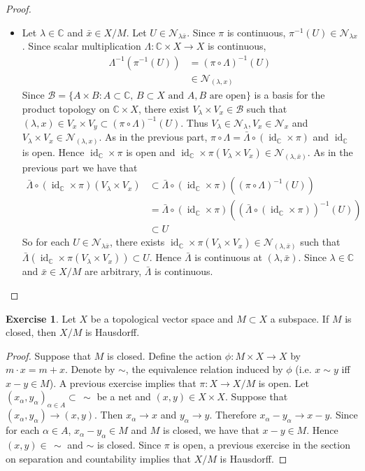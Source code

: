 \documentclass[12pt]{amsart}
\theoremstyle{definition}
\newtheorem{ex}[definition]{Exercise}
\newcommand{\al}{\alpha}
\newcommand{\lam}{\lambda}
\newcommand{\Lam}{\Lambda}
\newcommand{\C}{\mathbb{C}}
\newcommand{\MB}{\mathcal{B}}
\newcommand{\MN}{\mathcal{N}}
\DeclareMathOperator{\id}{id}
\begin{document}
\begin{proof}
\begin{itemize}
			\item Let $\lam \in \C$ and $\bar{x} \in X / M$. Let $U \in \MN_{\lam \bar{x}}$. Since $\pi$ is continuous, $\pi^{-1}(U) \in \MN_{\lam x}$. Since scalar multiplication $\Lam: \C \times X  \rightarrow X$ is continuous, 
			\begin{align*}
				\Lam^{-1}(\pi^{-1}(U)) 
				& = (\pi \circ \Lam)^{-1}( U) \\
				& \in \MN_{(\lam, x)}
			\end{align*} 
			Since $\MB = \{A \times B: \text{$A \subset \C$, $B \subset X$ and $A,B$ are open}\}$ is a basis for the product topology on $\C \times X$, there exist $V_{\lam} \times V_x \in \MB$ such that $(\lam,x) \in V_x \times V_y \subset  (\pi \circ \Lam)^{-1}(U)$. Thus $V_{\lam} \in \MN_{\lam}, V_x \in \MN_x$ and $V_{\lam} \times V_x \in \MN_{(\lam, x)}$. As in the previous part, $\pi \circ \Lam = \bar{\Lam} \circ (\id_{\C} \times \pi)$ and $\id_{\C}$ is open. Hence $\id_{\C} \times \pi$ is open and $\id_{\C} \times \pi (V_{\lam} \times V_x) \in \MN_{(\lam, \bar{x})}$. As in the previous part we have that 
			\begin{align*}
				\bar{\Lam} \circ (\id_{\C} \times \pi) (V_{\lam} \times V_x) 
				& \subset \bar{\Lam} \circ (\id_{\C} \times \pi)((\pi \circ \Lam)^{-1}(U)) \\
				& = \bar{\Lam} \circ (\id_{\C} \times \pi)((\bar{\Lam} \circ (\id_{\C} \times \pi))^{-1}(U)) \\
				& \subset U
			\end{align*} 
			So for each $U \in \MN_{\lam\bar{x}}$, there exists $\id_{\C} \times \pi(V_{\lam} \times V_x) \in \MN_{(\lam, \bar{x})}$ such that $\bar{\Lam}(\id_{\C} \times \pi(V_{\lam} \times V_x)) \subset U$. Hence $\bar{\Lam}$ is continuous at $(\lam, \bar{x})$. Since $\lam \in \C$ and $\bar{x} \in X/ M$ are arbitrary, $\bar{\Lam}$ is continuous. 
		\end{itemize}
	\end{proof}

	\begin{ex}
		Let $X$ be a topological vector space and $M \subset X$ a subspace. If $M$ is closed, then $X / M$ is Hausdorff. 
	\end{ex}
	
	\begin{proof}
		Suppose that $M$ is closed. Define the action $\phi: M \times X \rightarrow X$ by $m \cdot x = m  + x$. Denote by $\sim$, the equivalence relation induced by $\phi$ (i.e. $x \sim y$ iff $x-y \in M$). A previous exercise implies that $\pi: X \rightarrow X /M$ is open. Let $(x_{\al},y_{\al})_{\al \in A} \subset \, \sim$ be a net and $(x,y) \in X \times X$. Suppose that $(x_{\al},y_{\al}) \rightarrow (x,y)$. Then $x_{\al} \rightarrow x$ and $y_{\al} \rightarrow y$. Therefore $x_{\al} - y_{\al} \rightarrow x -y$. Since for each $\al \in A$, $x_{\al} - y_{\al} \in M$ and $M$ is closed, we have that $x -y \in M$. Hence $(x,y) \in \, \sim$ and $\sim$ is closed. Since $\pi$ is open, a previous exercise in the section on separation and countability implies that $X / M$ is Hausdorff.
	\end{proof}
	
\end{document}
